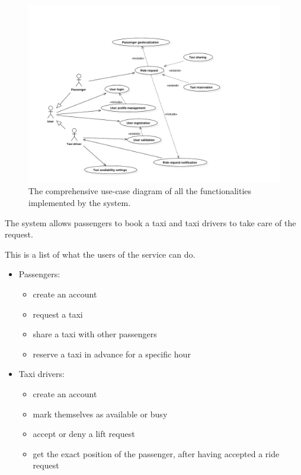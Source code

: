 \begin{figure}[ht]
\includegraphics[width=\textwidth]{diagrams/usecase_whole.pdf}
\caption{The comprehensive use-case diagram of all the functionalities implemented by the system.}
\end{figure}
The system allows passengers to book a taxi and taxi drivers to take care of the request.

This is a list of what the users of the service can do.
\begin{itemize}
\item Passengers:
    \begin{itemize}
    	\item create an account
    	\item request a taxi
    	\item share a taxi with other passengers
	\item reserve a taxi in advance for a specific hour
    \end{itemize}
\item Taxi drivers:
    \begin{itemize}
    	\item create an account
    	\item mark themselves as available or busy
    	\item accept or deny a lift request
	\item get the exact position of the passenger, after having accepted a ride request
    \end{itemize}
\end{itemize}
